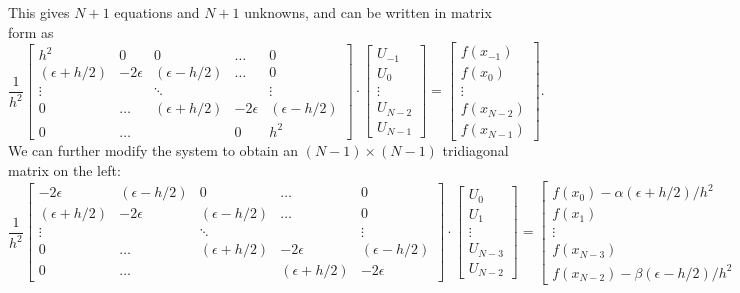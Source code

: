 This gives $N+1$ equations and $N+1$ unknowns, and can be written in matrix form as 
\[ \frac{1}{h^2} \begin{bmatrix}h^2 & 0 &0&\hdots &0 \\ (\epsilon + h/2) &-2\epsilon & (\epsilon - h/2) &\hdots &0\\ \vdots &  & \ddots & &\vdots \\
0 & \hdots & (\epsilon + h/2) &-2\epsilon & (\epsilon - h/2) \\ 0 & \hdots & & 0 & h^2
\end{bmatrix} \cdot \begin{bmatrix}U_{-1}\\U_0\\ \vdots \\U_{N-2} \\U_{N-1}\end{bmatrix} = \begin{bmatrix}f(x_{-1})\\f(x_0)\\ \vdots \\ f(x_{N-2}) \\ f(x_{N-1}) \end{bmatrix}.
\]
We can further modify the system to obtain an $(N-1)\times (N-1)$ tridiagonal matrix on the left: 
\[\frac{1}{h^2} \begin{bmatrix}-2\epsilon & (\epsilon - h/2) &0&\hdots &0 \\ (\epsilon + h/2) &-2\epsilon & (\epsilon - h/2) &\hdots &0\\ \vdots &  & \ddots & &\vdots \\
0 & \hdots & (\epsilon + h/2) &-2\epsilon & (\epsilon - h/2) \\ 0 & \hdots & & (\epsilon + h/2) &-2\epsilon
\end{bmatrix} \cdot \begin{bmatrix}U_{0}\\U_1\\ \vdots \\U_{N-3} \\U_{N-2}\end{bmatrix} = \begin{bmatrix}f(x_0) -\alpha(\epsilon + h/2)/h^2 \\f(x_1)\\ \vdots \\ f(x_{N-3})\\ f(x_{N-2})-\beta(\epsilon - h/2)/h^2 \end{bmatrix}.
\]

